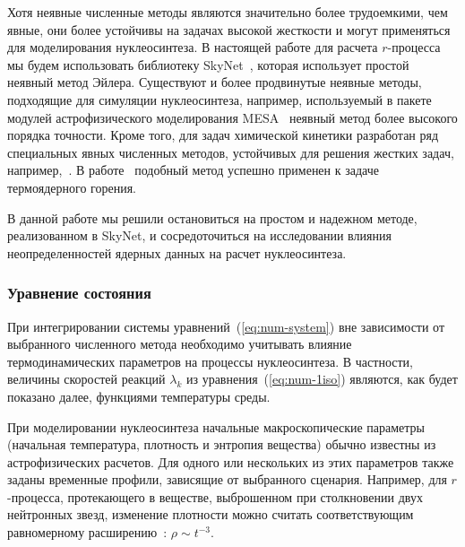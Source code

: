 Хотя неявные численные методы являются значительно более трудоемкими, чем явные, они более устойчивы на задачах высокой жесткости и могут применяться для моделирования нуклеосинтеза. В настоящей работе для расчета $r$-процесса мы будем использовать библиотеку SkyNet~\cite{lippuner2017}, которая использует простой неявный метод Эйлера. Существуют и более продвинутые неявные методы, подходящие для симуляции нуклеосинтеза, например, используемый в пакете модулей астрофизического моделирования MESA~\cite{paxton2011} неявный метод более высокого порядка точности. Кроме того, для задач химической кинетики разработан ряд специальных явных численных методов, устойчивых для решения жестких задач, например,~\cite{bulatov2018}. В работе~\cite{guidry2013} подобный метод успешно применен к задаче термоядерного горения.

В данной работе мы решили остановиться на простом и надежном методе, реализованном в SkyNet, и сосредоточиться на исследовании влияния неопределенностей ядерных данных на расчет нуклеосинтеза.

\subsubsection{Уравнение состояния }
При интегрировании системы уравнений~(\ref{eq:num-system}) вне зависимости от выбранного численного метода необходимо учитывать влияние термодинамических параметров на процессы нуклеосинтеза. В частности, величины скоростей реакций $\lambda_k$ из уравнения~(\ref{eq:num-1iso}) являются, как будет показано далее, функциями температуры среды. 

При моделировании нуклеосинтеза начальные макроскопические параметры (начальная температура, плотность и энтропия вещества) обычно известны из астрофизических расчетов. Для одного или нескольких из этих параметров также заданы временные профили, зависящие от выбранного сценария. Например, для $r$-процесса, протекающего в веществе, выброшенном при столкновении двух нейтронных звезд, изменение плотности можно считать соответствующим равномерному расширению~\cite{korobkin2012}: $\rho \sim t^{-3}$.
